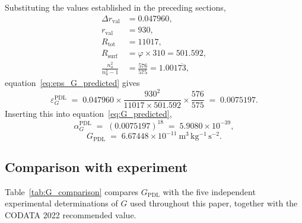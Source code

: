 \documentclass[11pt,a4paper]{article}
\begin{document}
Substituting the values established in the preceding sections,
\begin{align}
    \Delta r_{\mathrm{val}}           &= 0.047960,\\
    r_{\mathrm{val}}                  &= 930,\\
    R_{\mathrm{tot}}                  &= 11017,\\
    R_{\mathrm{surf}}                 &= \varphi \times 310 
                                         = 501.592,\\
    \frac{n_u^2}{n_u^2-1}            &= \frac{576}{575} 
                                         = 1.001\overline{73},
\end{align}
equation~\eqref{eq:eps_G_predicted} gives
\begin{equation}
    \varepsilon_G^{\mathrm{PDL}} 
    \;=\; 0.047960 \times
          \frac{930^2}{11017 \times 501.592} \times
          \frac{576}{575}
    \;=\; 0.0075197.
    \label{eq:eps_G_PDL_value}
\end{equation}
Inserting this into equation~\eqref{eq:G_predicted},
\begin{equation}
    \alpha_G^{\mathrm{PDL}} 
    \;=\; \left(0.0075197\right)^{18} 
    \;=\; 5.9080 \times 10^{-39},
\end{equation}
\begin{equation}
    \boxed{G_{\mathrm{PDL}} 
    \;=\; 6.67448 \times 10^{-11}\ 
          \mathrm{m^3\,kg^{-1}\,s^{-2}}.}
    \label{eq:G_PDL_value}
\end{equation}

\subsection{Comparison with experiment}

Table~\ref{tab:G_comparison} compares $G_{\mathrm{PDL}}$ with the five independent experimental determinations of $G$ used throughout this paper, together with the CODATA 2022 recommended value.
\end{document}
